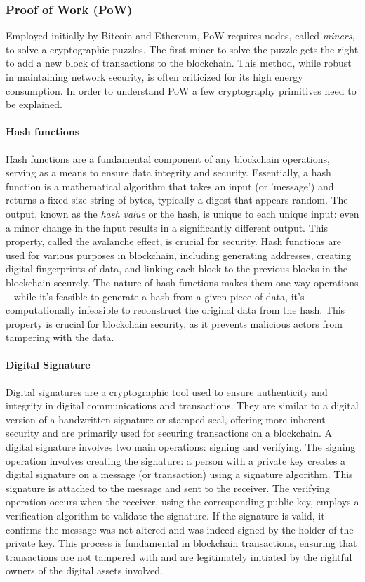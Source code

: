 \subsubsection{Proof of Work (PoW)} 
Employed initially by Bitcoin and Ethereum, PoW requires nodes, called \textit{miners}, to solve a cryptographic puzzles. The first miner to solve the puzzle gets the right to add a new block of transactions to the blockchain. This method, while robust in maintaining network security, is often criticized for its high energy consumption. In order to understand PoW a few cryptography primitives need to be explained.


\paragraph{Hash functions}
Hash functions are a fundamental component of any blockchain operations, serving as a means to ensure data integrity and security. Essentially, a hash function is a mathematical algorithm that takes an input (or 'message') and returns a fixed-size string of bytes, typically a digest that appears random. The output, known as the \textit{hash value} or the hash, is unique to each unique input: even a minor change in the input results in a significantly different output. This property, called the avalanche effect, is crucial for security. Hash functions are used for various purposes in blockchain, including generating addresses, creating digital fingerprints of data, and linking each block to the previous blocks in the blockchain securely. The nature of hash functions makes them one-way operations – while it's feasible to generate a hash from a given piece of data, it's computationally infeasible to reconstruct the original data from the hash. This property is crucial for blockchain security, as it prevents malicious actors from tampering with the data.


\paragraph{Digital Signature}\label{digital_signature}
Digital signatures are a cryptographic tool used to ensure authenticity and integrity in digital communications and transactions. They are similar to a digital version of a handwritten signature or stamped seal, offering more inherent security and are primarily used for securing transactions on a blockchain. A digital signature involves two main operations: signing and verifying. The signing operation involves creating the signature: a person with a private key creates a digital signature on a message (or transaction) using a signature algorithm. This signature is attached to the message and sent to the receiver. The verifying operation occurs when the receiver, using the corresponding public key, employs a verification algorithm to validate the signature. If the signature is valid, it confirms the message was not altered and was indeed signed by the holder of the private key. This process is fundamental in blockchain transactions, ensuring that transactions are not tampered with and are legitimately initiated by the rightful owners of the digital assets involved.


